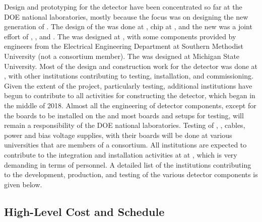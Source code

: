Design and prototyping for the   detector have been 
concentrated so far at the DOE national laboratories, mostly because the 
focus was on designing the new generation of . The design 
of the   was done at ,  
chip at , and the new  was a joint effort of 
, , and . The  
 was designed at , with some components 
provided by engineers from the Electrical Engineering Department
at Southern Methodist University (not a consortium member).
The  was designed at Michigan State University.
Most of the design and construction work for the  detector 
was done at , with other institutions contributing to 
testing, installation, and commissioning. Given the extent of the project, 
particularly testing, additional institutions have begun to contribute
to all activities for constructing the  detector, which began 
in the middle of 2018. Almost all the engineering of detector components, 
except for the boards to be installed on the  and most boards 
and setups for testing, will remain a responsibility
of the DOE national laboratories. Testing of 
, , cables, power and bias voltage supplies,
 with their boards will be done at various
universities that are members of a consortium. All institutions
are expected to contribute to the integration and installation activities at
at , which is very
demanding in terms of personnel. A detailed list of the 
institutions contributing to the development, production, and
testing of the various detector components is given below.

\subsection{High-Level Cost and Schedule}
\label{sec:fdsp-tpcelec-management-cost}


